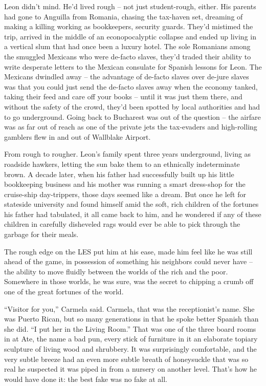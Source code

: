 Leon didn't mind. He'd lived rough -- not just student-rough, either. 
His parents had gone to Anguilla from Romania, chasing the tax-haven 
set, dreaming of making a killing working as bookkeepers, security 
guards. They'd mistimed the trip, arrived in the middle of an 
econopocalyptic collapse and ended up living in a vertical slum that 
had once been a luxury hotel. The sole Romanians among the smuggled 
Mexicans who were de-facto slaves, they'd traded their ability to write 
desperate letters to the Mexican consulate for Spanish lessons for 
Leon. The Mexicans dwindled away -- the advantage of de-facto slaves 
over de-jure slaves was that you could just send the de-facto slaves 
away when the economy tanked, taking their feed and care off your books 
-- until it was just them there, and without the safety of the crowd, 
they'd been spotted by local authorities and had to go underground. 
Going back to Bucharest was out of the question -- the airfare was as 
far out of reach as one of the private jets the tax-evaders and 
high-rolling gamblers flew in and out of Wallblake Airport.

From rough to rougher. Leon's family spent three years underground, 
living as roadside hawkers, letting the sun bake them to an ethnically 
indeterminate brown. A decade later, when his father had successfully 
built up his little bookkeeping business and his mother was running a 
smart dress-shop for the cruise-ship day-trippers, those days seemed 
like a dream. But once he left for stateside university and found 
himself amid the soft, rich children of the fortunes his father had 
tabulated, it all came back to him, and he wondered if any of these 
children in carefully disheveled rags would ever be able to pick 
through the garbage for their meals.

The rough edge on the LES put him at his ease, made him feel like he 
was still ahead of the game, in possession of something his neighbors 
could never have -- the ability to move fluidly between the worlds of 
the rich and the poor. Somewhere in those worlds, he was sure, was the 
secret to chipping a crumb off one of the great fortunes of the world.

\tb

“Visitor for you,” Carmela said. Carmela, that was the 
receptionist's name. She was Puerto Rican, but so many generations in 
that he spoke better Spanish than she did. “I put her in the Living 
Room.” That was one of the three board rooms in at Ate, the name a 
bad pun, every stick of furniture in it an elaborate topiary sculpture 
of living wood and shrubbery. It was surprisingly comfortable, and the 
very subtle breeze had an even more subtle breath of honeysuckle that 
was so real he suspected it was piped in from a nursery on another 
level. That's how he would have done it: the best fake was no fake at 
all.


